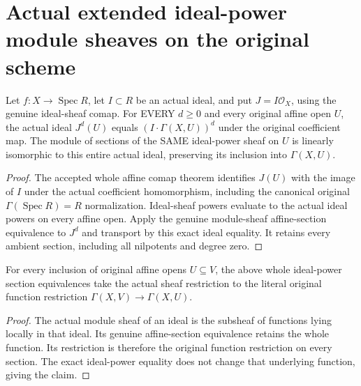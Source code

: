 \section{Actual extended ideal-power module sheaves on the original scheme}

\begin{lemma}
\label{lem:fibre-ideal-power-affine-sections}
\leanok
{}
Let $f:X\to\operatorname{Spec}R$, let $I\subset R$ be an actual ideal,
and put $J=I\mathcal O_X$, using the genuine ideal-sheaf comap. For
EVERY $d\ge0$ and every original affine open $U$, the actual ideal
$J^d(U)$ equals $(I\cdot\Gamma(X,U))^d$ under the original coefficient
map. The module of sections of the SAME ideal-power sheaf on $U$ is
linearly isomorphic to this entire actual ideal, preserving its
inclusion into $\Gamma(X,U)$.
\end{lemma}
\begin{proof}
The accepted whole affine comap theorem identifies $J(U)$ with the
image of $I$ under the actual coefficient homomorphism, including the
canonical original $\Gamma(\operatorname{Spec}R)=R$ normalization.
Ideal-sheaf powers evaluate to the actual ideal powers on every affine
open. Apply the genuine module-sheaf affine-section equivalence to
$J^d$ and transport by this exact ideal equality. It retains every
ambient section, including all nilpotents and degree zero.
\end{proof}

\begin{lemma}
\label{lem:fibre-ideal-power-restrictions}
\leanok
{}
For every inclusion of original affine opens $U\subseteq V$, the above
whole ideal-power section equivalences take the actual sheaf restriction
to the literal original function restriction $\Gamma(X,V)\to\Gamma(X,U)$.
\end{lemma}
\begin{proof}
The actual module sheaf of an ideal is the subsheaf of functions lying
locally in that ideal. Its genuine affine-section equivalence retains
the whole function. Its restriction is therefore the original function
restriction on every section. The exact ideal-power equality does not
change that underlying function, giving the claim.
\end{proof}

